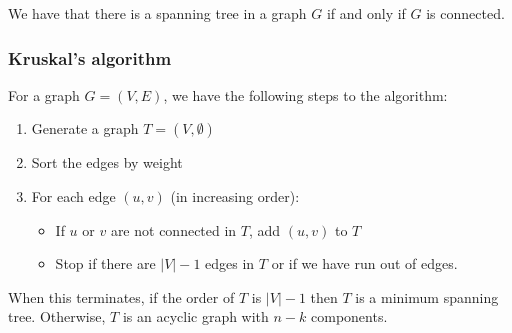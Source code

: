 \documentclass[a4paper, 12pt, twoside]{article}
\begin{document}
We have that there is a spanning tree in a graph $G$ if and only if
$G$ is connected.

\newpage

\subsubsection{Kruskal's algorithm}

For a graph $G = (V, E)$, we have 
the following steps to the algorithm: \begin{enumerate}
  \item Generate a graph $T = (V, \emptyset)$
  \item Sort the edges by weight
  \item For each edge $(u, v)$ (in increasing order): \begin{itemize}
    \item If $u$ or $v$ are not connected in $T$, add $(u, v)$ to $T$
    \item Stop if there are $|V| - 1$ edges in $T$ or if we have run
    out of edges.
  \end{itemize}
\end{enumerate} When this terminates, if the order of $T$ is $|V| - 1$
then $T$ is a minimum spanning tree. Otherwise, $T$ is an acyclic
graph with $n - k$ components.
\end{document}
